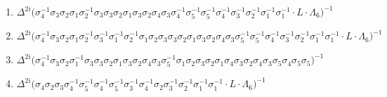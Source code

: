 \vspace{0.3cm}
\begingroup
\raggedbottom
\begin{enumerate}
    \item $\displaystyle \Delta^{2i} \big( \allowbreak\sigma_{4}^{-1}\allowbreak\sigma_{3}\allowbreak\sigma_{2}\allowbreak\sigma_{1}\allowbreak\sigma_{2}^{-1}\allowbreak\sigma_{3}\allowbreak\sigma_{3}\allowbreak\sigma_{2}\allowbreak\sigma_{1}\allowbreak\sigma_{3}\allowbreak\sigma_{2}\allowbreak\sigma_{4}\allowbreak\sigma_{3}\allowbreak\sigma_{4}^{-1}\allowbreak\sigma_{5}^{-1}\allowbreak\sigma_{5}^{-1}\allowbreak\sigma_{4}^{-1}\allowbreak\sigma_{3}^{-1}\allowbreak\sigma_{2}^{-1}\allowbreak\sigma_{1}^{-1}\allowbreak\sigma_{1}^{-1} \cdot L \cdot \Lambda_6 \big)^{-1}$
    \item $\displaystyle \Delta^{2i} \big( \allowbreak\sigma_{4}^{-1}\allowbreak\sigma_{3}\allowbreak\sigma_{2}\allowbreak\sigma_{1}\allowbreak\sigma_{2}^{-1}\allowbreak\sigma_{3}^{-1}\allowbreak\sigma_{1}^{-1}\allowbreak\sigma_{2}^{-1}\allowbreak\sigma_{1}\allowbreak\sigma_{2}\allowbreak\sigma_{3}\allowbreak\sigma_{3}\allowbreak\sigma_{2}\allowbreak\sigma_{1}\allowbreak\sigma_{3}\allowbreak\sigma_{2}\allowbreak\sigma_{4}\allowbreak\sigma_{3}\allowbreak\sigma_{5}^{-1}\allowbreak\sigma_{5}^{-1}\allowbreak\sigma_{4}^{-1}\allowbreak\sigma_{3}^{-1}\allowbreak\sigma_{2}^{-1}\allowbreak\sigma_{1}^{-1}\allowbreak\sigma_{1}^{-1} \cdot L \cdot \Lambda_6 \big)^{-1}$
    \item $\displaystyle \Delta^{2i} \big( \allowbreak\sigma_{4}^{-1}\allowbreak\sigma_{3}\allowbreak\sigma_{2}\allowbreak\sigma_{1}^{-1}\allowbreak\sigma_{3}\allowbreak\sigma_{3}\allowbreak\sigma_{2}\allowbreak\sigma_{1}\allowbreak\sigma_{3}\allowbreak\sigma_{2}\allowbreak\sigma_{4}\allowbreak\sigma_{3}\allowbreak\sigma_{5}^{-1}\allowbreak\sigma_{1}\allowbreak\sigma_{2}\allowbreak\sigma_{3}\allowbreak\sigma_{2}\allowbreak\sigma_{1}\allowbreak\sigma_{4}\allowbreak\sigma_{3}\allowbreak\sigma_{2}\allowbreak\sigma_{4}\allowbreak\sigma_{3}\allowbreak\sigma_{5}\allowbreak\sigma_{4}\allowbreak\sigma_{5}\allowbreak\sigma_{5} \big)^{-1}$
    \item $\displaystyle \Delta^{2i} \big( \allowbreak\sigma_{4}\allowbreak\sigma_{2}\allowbreak\sigma_{3}\allowbreak\sigma_{4}^{-1}\allowbreak\sigma_{5}^{-1}\allowbreak\sigma_{4}^{-1}\allowbreak\sigma_{5}^{-1}\allowbreak\sigma_{3}^{-1}\allowbreak\sigma_{4}^{-1}\allowbreak\sigma_{2}\allowbreak\sigma_{3}^{-1}\allowbreak\sigma_{2}^{-1}\allowbreak\sigma_{1}^{-1}\allowbreak\sigma_{1}^{-1} \cdot L \cdot \Lambda_6 \big)^{-1}$
\end{enumerate}
\endgroup

